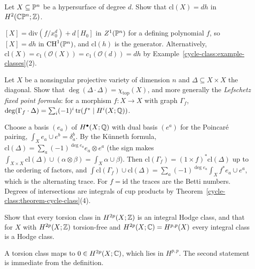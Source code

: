 \begin{exercise}\label{cycle-class:exercise-hypersurface-class}
Let $X \subseteq \mathbb{P}^n$ be a hypersurface of degree $d$. Show that $\mathrm{cl}(X) = dh$ in $H^2(\mathbb{C}\mathbb{P}^n; \mathbb{Z})$.
\end{exercise}

\begin{solution}
$[X] = \mathrm{div}(f/x_0^d) + d[H_0]$ in $Z^1(\mathbb{P}^n)$ for a defining polynomial $f$, so $[X] = dh$ in $\operatorname{CH}^1(\mathbb{P}^n)$, and $\mathrm{cl}(h)$ is the generator. Alternatively,
$\mathrm{cl}(X) = c_1(\mathcal{O}(X)) = c_1(\mathcal{O}(d)) = dh$ by Example~\ref{cycle-class:example-classes}(2).
\end{solution}

\begin{exercise}\label{cycle-class:exercise-diagonal}
Let $X$ be a nonsingular projective variety of dimension $n$ and $\Delta \subseteq X \times X$ the diagonal. Show that $\deg(\Delta \cdot \Delta) = \chi_{\mathrm{top}}(X)$, and more generally
the \emph{Lefschetz fixed point formula}: for a morphism $f \colon X \to X$ with graph $\Gamma_f$, $\deg(\Gamma_f \cdot \Delta) = \sum_i(-1)^i\operatorname{tr}(f^* \mid H^i(X; \mathbb{Q}))$.
\end{exercise}

\begin{solution}
Choose a basis $(e_a)$ of $H^\bullet(X; \mathbb{Q})$ with dual basis $(e^a)$ for the Poincar\'e pairing, $\int_Xe_a \cup e^b = \delta_a^b$. By the K\"unneth formula,
$\mathrm{cl}(\Delta) = \sum_a(-1)^{\deg e_a}e_a \otimes e^a$ (the sign makes $\int_{X \times X}\mathrm{cl}(\Delta) \cup (\alpha \otimes \beta) = \int_X\alpha \cup \beta$). Then
$\mathrm{cl}(\Gamma_f) = (1 \times f)^*\mathrm{cl}(\Delta)$ up to the ordering of factors, and $\int\mathrm{cl}(\Gamma_f) \cup \mathrm{cl}(\Delta) = \sum_a(-1)^{\deg e_a}\int_Xf^*e_a \cup e^a$, which is the
alternating trace. For $f = \mathrm{id}$ the traces are the Betti numbers. Degrees of intersections are integrals of cup products by Theorem~\ref{cycle-class:theorem-cycle-class}(4).
\end{solution}

\begin{exercise}\label{cycle-class:exercise-torsion-hodge}
Show that every torsion class in $H^{2p}(X; \mathbb{Z})$ is an integral Hodge class, and that for $X$ with $H^{2p}(X; \mathbb{Z})$ torsion-free and $H^{2p}(X; \mathbb{C}) = H^{p,p}(X)$ every integral class is a
Hodge class.
\end{exercise}

\begin{solution}
A torsion class maps to $0 \in H^{2p}(X; \mathbb{C})$, which lies in $H^{p,p}$. The second statement is immediate from the definition.
\end{solution}
